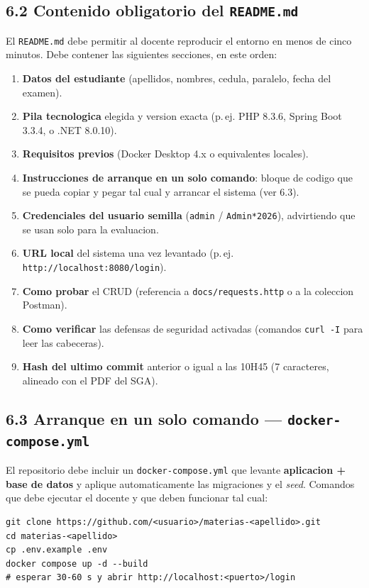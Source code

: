 \documentclass[10pt,a4paper]{article}
\begin{document}
\subsection*{6.2 Contenido obligatorio del \texttt{README.md}}
El \texttt{README.md} debe permitir al docente reproducir el entorno en menos de cinco minutos. Debe contener las siguientes secciones, en este orden:
\begin{enumerate}[leftmargin=1.4em,itemsep=1pt,topsep=2pt]
    \item \textbf{Datos del estudiante} (apellidos, nombres, cedula, paralelo, fecha del examen).
    \item \textbf{Pila tecnologica} elegida y version exacta (p.\,ej. PHP 8.3.6, Spring Boot 3.3.4, o .NET 8.0.10).
    \item \textbf{Requisitos previos} (Docker Desktop 4.x o equivalentes locales).
    \item \textbf{Instrucciones de arranque en un solo comando}: bloque de codigo que se pueda copiar y pegar tal cual y arrancar el sistema (ver 6.3).
    \item \textbf{Credenciales del usuario semilla} (\texttt{admin} / \texttt{Admin*2026}), advirtiendo que se usan solo para la evaluacion.
    \item \textbf{URL local} del sistema una vez levantado (p.\,ej. \texttt{http://localhost:8080/login}).
    \item \textbf{Como probar} el CRUD (referencia a \texttt{docs/requests.http} o a la coleccion Postman).
    \item \textbf{Como verificar} las defensas de seguridad activadas (comandos \texttt{curl -I} para leer las cabeceras).
    \item \textbf{Hash del ultimo commit} anterior o igual a las 10H45 (7 caracteres, alineado con el PDF del SGA).
\end{enumerate}

\subsection*{6.3 Arranque en un solo comando --- \texttt{docker-compose.yml}}
El repositorio debe incluir un \texttt{docker-compose.yml} que levante \textbf{aplicacion + base de datos} y aplique automaticamente las migraciones y el \emph{seed}. Comandos que debe ejecutar el docente y que deben funcionar tal cual:
\begin{lstlisting}[style=shellestilo]
git clone https://github.com/<usuario>/materias-<apellido>.git
cd materias-<apellido>
cp .env.example .env
docker compose up -d --build
# esperar 30-60 s y abrir http://localhost:<puerto>/login
\end{lstlisting}
\end{document}

